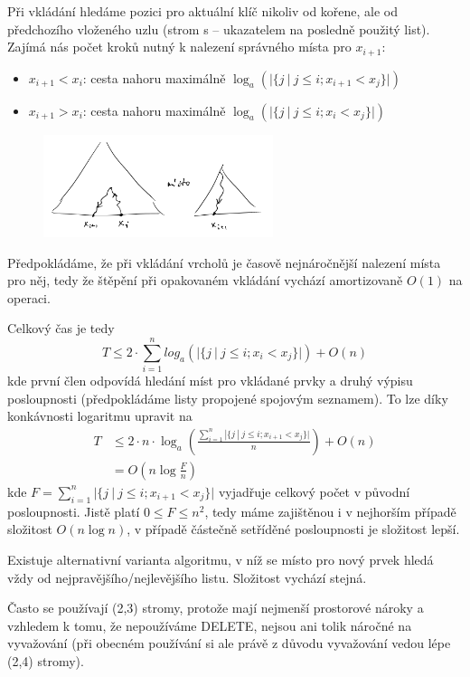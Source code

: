 \documentclass[11pt]{report} %
\numberwithin{equation}{section}
\begin{document}
Při vkládání hledáme pozici pro aktuální klíč nikoliv od kořene, ale od předchozího vloženého uzlu (strom s  -- ukazatelem na posledně použitý list). Zajímá nás počet kroků nutný k nalezení správného místa pro $x_{i+1}$:
\begin{itemize}
\item $x_{i+1} < x_i$: cesta nahoru maximálně $\log_a(|\{j\ |\ j\leq i; x_{i+1} < x_{j} \}|)$
\item $x_{i+1} > x_i$: cesta nahoru maximálně $\log_a(|\{j\ |\ j\leq i; x_{i} < x_{j} \}|)$
\end{itemize}

\begin{figure}[H]
	\centering\includegraphics[width=0.6\textwidth]{img/asort.png}
\end{figure}


Předpokládáme, že při vkládání vrcholů je časově nejnáročnější nalezení místa pro něj, tedy že štěpění při opakovaném vkládání vychází amortizovaně $O(1)$ na operaci.

Celkový čas je tedy
$$T \leq 2\cdot \sum\limits_{i=1}^{n} log_a(|\{j\ |\ j\leq i; x_{i} < x_{j} \}|) + O(n)$$
kde první člen odpovídá hledání míst pro vkládané prvky a druhý výpisu posloupnosti (předpokládáme listy propojené spojovým seznamem). To lze díky konkávnosti logaritmu upravit na
\begin{align*}
T &\leq 2\cdot n\cdot \log_a\left(\frac{\sum\limits_{i=1}^{n} |\{j\ |\ j\leq i; x_{i+1} < x_{j} \}|}{n}\right) + O(n)\\
&= O(n\log\frac{F}{n})
\end{align*}
kde $F = \sum\limits_{i=1}^{n} |\{j\ |\ j\leq i; x_{i+1} < x_{j} \}|$ vyjadřuje celkový počet  v původní posloupnosti. Jistě platí $0 \leq F \leq n^2$, tedy máme zajištěnou i v nejhorším případě složitost $O(n\log n)$, v případě částečně setříděné posloupnosti je složitost lepší.

Existuje alternativní varianta algoritmu, v níž se místo pro nový prvek hledá vždy od nejpravějšího/nejlevějšího listu. Složitost vychází stejná.

Často se používají (2,3) stromy, protože mají nejmenší prostorové nároky a vzhledem k tomu, že nepoužíváme DELETE, nejsou ani tolik náročné na vyvažování (při obecném používání si ale právě z důvodu vyvažování vedou lépe (2,4) stromy).
\end{document}
